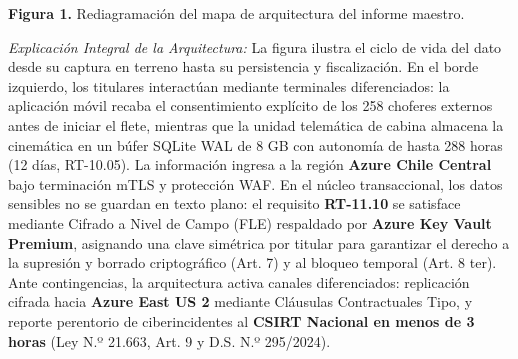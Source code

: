 \begin{center}
\end{center}
{\footnotesize\textbf{Figura 1.} Rediagramación del mapa de arquitectura del informe maestro.}


\emph{Explicación Integral de la Arquitectura:} La figura ilustra el ciclo de vida del dato desde su captura en terreno hasta su persistencia y fiscalización. En el borde izquierdo, los titulares interactúan mediante terminales diferenciados: la aplicación móvil recaba el consentimiento explícito de los 258 choferes externos antes de iniciar el flete, mientras que la unidad telemática de cabina almacena la cinemática en un búfer SQLite WAL de 8 GB con autonomía de hasta 288 horas (12 días, RT-10.05). La información ingresa a la región \textbf{Azure Chile Central} bajo terminación mTLS y protección WAF. En el núcleo transaccional, los datos sensibles no se guardan en texto plano: el requisito \textbf{RT-11.10} se satisface mediante Cifrado a Nivel de Campo (FLE) respaldado por \textbf{Azure Key Vault Premium}, asignando una clave simétrica por titular para garantizar el derecho a la supresión y borrado criptográfico (Art. 7) y al bloqueo temporal (Art. 8 ter). Ante contingencias, la arquitectura activa canales diferenciados: replicación cifrada hacia \textbf{Azure East US 2} mediante Cláusulas Contractuales Tipo, y reporte perentorio de ciberincidentes al \textbf{CSIRT Nacional en menos de 3 horas} (Ley N.º 21.663, Art. 9 y D.S. N.º 295/2024).
